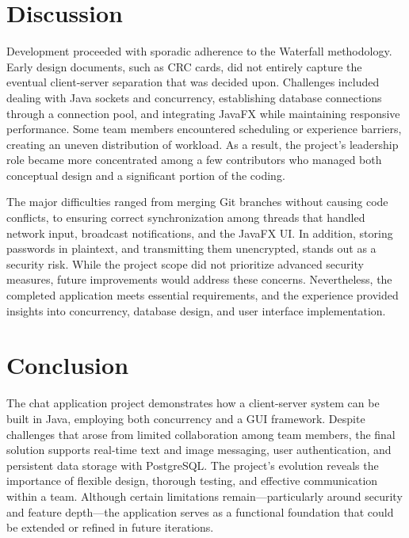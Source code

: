 \documentclass[12pt,a4paper]{report}
\begin{document}
\chapter{Discussion}
Development proceeded with sporadic adherence to the Waterfall methodology.
Early design documents, such as CRC cards, did not entirely capture the
eventual client-server separation that was decided upon. Challenges included
dealing with Java sockets and concurrency, establishing database connections
through a connection pool, and integrating JavaFX while maintaining responsive
performance. Some team members encountered scheduling or experience barriers,
creating an uneven distribution of workload. As a result, the project’s
leadership role became more concentrated among a few contributors who managed
both conceptual design and a significant portion of the coding.

The major difficulties ranged from merging Git branches without causing code
conflicts, to ensuring correct synchronization among threads that handled
network input, broadcast notifications, and the JavaFX UI. In addition, storing
passwords in plaintext, and transmitting them unencrypted, stands out as a
security risk. While the project scope did not prioritize advanced security
measures, future improvements would address these concerns. Nevertheless, the
completed application meets essential requirements, and the experience provided
insights into concurrency, database design, and user interface implementation.

\chapter{Conclusion}
The chat application project demonstrates how a client-server system can be
built in Java, employing both concurrency and a GUI framework. Despite
challenges that arose from limited collaboration among team members, the final
solution supports real-time text and image messaging, user authentication, and
persistent data storage with PostgreSQL. The project’s evolution reveals the
importance of flexible design, thorough testing, and effective communication
within a team. Although certain limitations remain—particularly around security
and feature depth—the application serves as a functional foundation that could
be extended or refined in future iterations.
\end{document}
